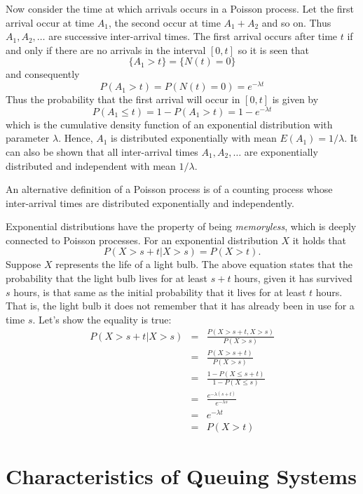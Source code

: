 \documentclass[
]{book}
\begin{document}
Now consider the time at which arrivals occurs in a Poisson process. Let the first arrival occur at time \(A_1\), the second occur at time \(A_1+ A_2\) and so on. Thus \(A_1,A_2,\dots\) are successive inter-arrival times. The first arrival occurs after time \(t\) if and only if there are no arrivals in the interval \([0,t]\) so it is seen that
\[
\{A_1>t\}=\{N(t)=0\}
\]
and consequently
\[
P(A_1>t)=P(N(t)=0)=e^{-\lambda t}
\]
Thus the probability that the first arrival will occur in \([0,t]\) is given by
\[
P(A_1\leq t)= 1- P(A_1>t)= 1- e^{-\lambda t}
\]
which is the cumulative density function of an exponential distribution with parameter \(\lambda\). Hence, \(A_1\) is distributed exponentially with mean \(E(A_1)=1/\lambda\). It can also be shown that all inter-arrival times \(A_1,A_2,\dots\) are exponentially distributed and independent with mean \(1/\lambda\).

An alternative definition of a Poisson process is of a counting process whose inter-arrival times are distributed exponentially and independently.

Exponential distributions have the property of being \emph{memoryless}, which is deeply connected to Poisson processes. For an exponential distribution \(X\) it holds that
\[
P(X> s+t|X>s)=P(X>t).
\]
Suppose \(X\) represents the life of a light bulb. The above equation states that the probability that the light bulb lives for at least \(s+t\) hours, given it has survived \(s\) hours, is that same as the initial probability that it lives for at least \(t\) hours. That is, the light bulb it does not remember that it has already been in use for a time \(s\). Let's show the equality is true:
\begin{eqnarray*}
P(X>s+t | X>s) &=& \frac{P(X > s + t, X >s)}{P(X>s)}\\
&=& \frac{P(X > s + t)}{P(X>s)}\\
&=&\frac{1- P(X \leq s + t)}{1 - P(X \leq s)}\\
&=&\frac{e^{-\lambda(s+t)}}{e^{-\lambda s}}\\
&=& e^{-\lambda t}\\
&=& P(X>t)
\end{eqnarray*}

\hypertarget{characteristics-of-queuing-systems}{%
\section{Characteristics of Queuing Systems}\label{characteristics-of-queuing-systems}}
\end{document}
